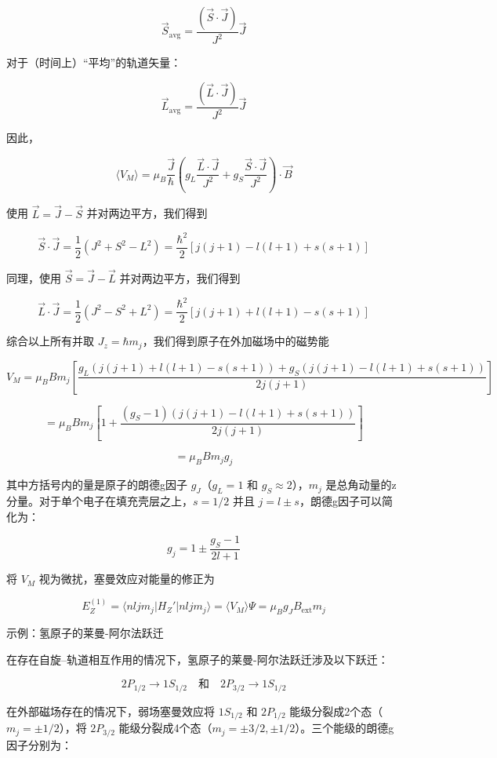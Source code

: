 \documentclass[dvipsnames, svgnames,a4paper,11pt]{article}
\begin{document}
	$$
	\vec{S}_{\text{avg}} = \frac{(\vec{S} \cdot \vec{J})}{J^2} \vec{J}
	$$
	
	对于（时间上）“平均”的轨道矢量：
	
	$$
	\vec{L}_{\text{avg}} = \frac{(\vec{L} \cdot \vec{J})}{J^2} \vec{J}
	$$
	
	因此，
	
	$$
	\langle V_M \rangle = \mu_B \frac{\vec{J}}{\hbar} \left( g_L \frac{\vec{L} \cdot \vec{J}}{J^2} + g_S \frac{\vec{S} \cdot \vec{J}}{J^2} \right) \cdot \vec{B}
	$$
	
	使用 $\vec{L} = \vec{J} - \vec{S}$ 并对两边平方，我们得到
	
	$$
	\vec{S} \cdot \vec{J} = \frac{1}{2} \left( J^2 + S^2 - L^2 \right) = \frac{\hbar^2}{2} \left[ j(j + 1) - l(l + 1) + s(s + 1) \right]
	$$
	
	同理，使用 $\vec{S} = \vec{J} - \vec{L}$ 并对两边平方，我们得到
	
	$$
	\vec{L} \cdot \vec{J} = \frac{1}{2} \left( J^2 - S^2 + L^2 \right) = \frac{\hbar^2}{2} \left[ j(j + 1) + l(l + 1) - s(s + 1) \right]
	$$
	
	综合以上所有并取 $J_z = \hbar m_j$，我们得到原子在外加磁场中的磁势能
	
	$$
	V_M = \mu_B B m_j \left[ \frac{g_L \left( j(j + 1) + l(l + 1) - s(s + 1) \right) + g_S \left( j(j + 1) - l(l + 1) + s(s + 1) \right)}{2 j(j + 1)} \right]
	$$
	
	$$
	= \mu_B B m_j \left[ 1 + \frac{(g_S - 1) \left( j(j + 1) - l(l + 1) + s(s + 1) \right)}{2 j(j + 1)} \right]
	$$
	
	$$
	= \mu_B B m_j g_j
	$$
	
	其中方括号内的量是原子的朗德g因子 $g_J$（$g_L = 1$ 和 $g_S \approx 2$），$m_j$ 是总角动量的z分量。对于单个电子在填充壳层之上，$s = 1/2$ 并且 $j = l \pm s$，朗德g因子可以简化为：
	
	$$
	g_j = 1 \pm \frac{g_S - 1}{2l + 1}
	$$
	
	将 $V_M$ 视为微扰，塞曼效应对能量的修正为
	
	$$
	E_Z^{(1)} = \langle n l j m_j | H_Z' | n l j m_j \rangle = \langle V_M \rangle \Psi = \mu_B g_J B_{\text{ext}} m_j
	$$
	
	示例：氢原子的莱曼-阿尔法跃迁
	
	在存在自旋–轨道相互作用的情况下，氢原子的莱曼-阿尔法跃迁涉及以下跃迁：
	
	$$
	2P_{1/2} \rightarrow 1S_{1/2} \quad \text{和} \quad 2P_{3/2} \rightarrow 1S_{1/2}
	$$
	
	在外部磁场存在的情况下，弱场塞曼效应将 $1S_{1/2}$ 和 $2P_{1/2}$ 能级分裂成2个态（$m_j = \pm 1/2$），将 $2P_{3/2}$ 能级分裂成4个态（$m_j = \pm 3/2, \pm 1/2$）。三个能级的朗德g因子分别为：
	
\end{document}
